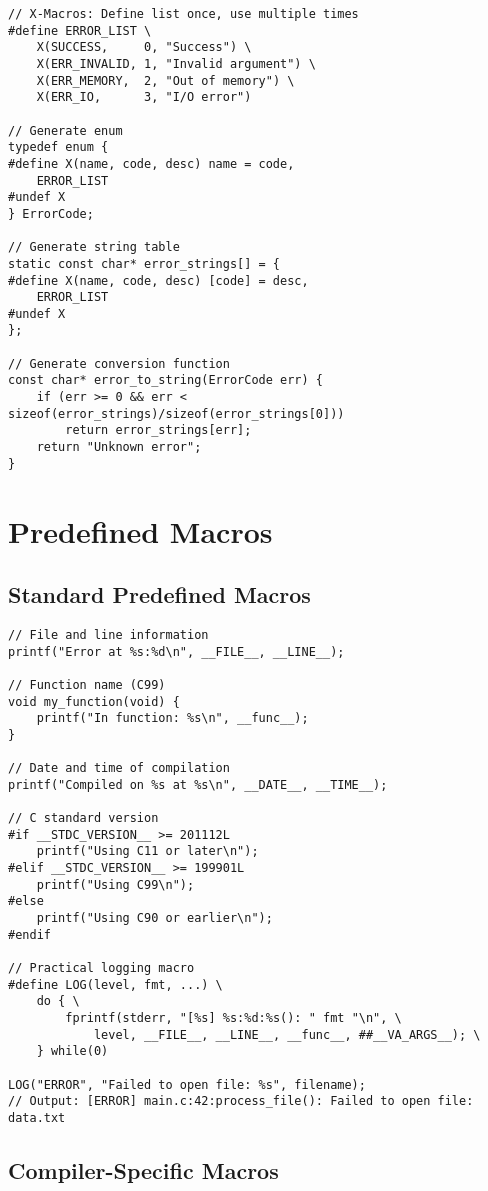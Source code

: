\begin{lstlisting}
// X-Macros: Define list once, use multiple times
#define ERROR_LIST \
    X(SUCCESS,     0, "Success") \
    X(ERR_INVALID, 1, "Invalid argument") \
    X(ERR_MEMORY,  2, "Out of memory") \
    X(ERR_IO,      3, "I/O error")

// Generate enum
typedef enum {
#define X(name, code, desc) name = code,
    ERROR_LIST
#undef X
} ErrorCode;

// Generate string table
static const char* error_strings[] = {
#define X(name, code, desc) [code] = desc,
    ERROR_LIST
#undef X
};

// Generate conversion function
const char* error_to_string(ErrorCode err) {
    if (err >= 0 && err < sizeof(error_strings)/sizeof(error_strings[0]))
        return error_strings[err];
    return "Unknown error";
}
\end{lstlisting}

\section{Predefined Macros}

\subsection{Standard Predefined Macros}

\begin{lstlisting}
// File and line information
printf("Error at %s:%d\n", __FILE__, __LINE__);

// Function name (C99)
void my_function(void) {
    printf("In function: %s\n", __func__);
}

// Date and time of compilation
printf("Compiled on %s at %s\n", __DATE__, __TIME__);

// C standard version
#if __STDC_VERSION__ >= 201112L
    printf("Using C11 or later\n");
#elif __STDC_VERSION__ >= 199901L
    printf("Using C99\n");
#else
    printf("Using C90 or earlier\n");
#endif

// Practical logging macro
#define LOG(level, fmt, ...) \
    do { \
        fprintf(stderr, "[%s] %s:%d:%s(): " fmt "\n", \
            level, __FILE__, __LINE__, __func__, ##__VA_ARGS__); \
    } while(0)

LOG("ERROR", "Failed to open file: %s", filename);
// Output: [ERROR] main.c:42:process_file(): Failed to open file: data.txt
\end{lstlisting}

\subsection{Compiler-Specific Macros}

